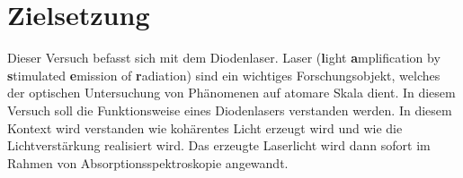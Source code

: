 \chapter{Zielsetzung}
\label{cha:zielsetzung}

Dieser Versuch befasst sich mit dem Diodenlaser. Laser (\textbf{l}ight \textbf{a}mplification by \textbf{s}timulated \textbf{e}mission of \textbf{r}adiation) sind ein wichtiges 
Forschungsobjekt, welches der optischen Untersuchung von Phänomenen auf atomare Skala dient. In diesem Versuch soll die Funktionsweise eines  Diodenlasers verstanden 
werden. In diesem Kontext wird verstanden wie kohärentes Licht erzeugt wird und wie die Lichtverstärkung realisiert wird. Das erzeugte Laserlicht wird dann sofort im Rahmen von 
Absorptionsspektroskopie angewandt. 